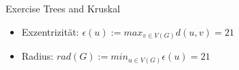 \begin{frame}[allowframebreaks]{Exercise \thesection}{Trees and Kruskal}
\begin{solutionnoinc}
{\begin{minipage}[t]{22cm}
          \end{minipage}
      }
    \end{solutionnoinc}
    \begin{solution}
      \begin{itemize}
        \item \alert{Exzentrizität:} $\epsilon(u) := max_{v\in V(G)} d(u,v) = 21$
        \item \alert{Radius:} $rad(G) := min_{u\in V(G)} \epsilon(u) = 21$
      \end{itemize}
    \end{solution}
\end{frame}
